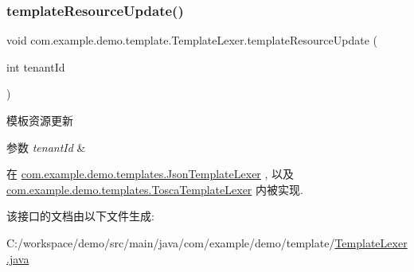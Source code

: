 \mbox{\label{interfacecom_1_1example_1_1demo_1_1template_1_1_template_lexer_a83b30db96a9095fe1fa5d9a9040c0ceb}} 
\subsubsection{\texorpdfstring{template\+Resource\+Update()}{templateResourceUpdate()}}
{\footnotesize\ttfamily void com.\+example.\+demo.\+template.\+Template\+Lexer.\+template\+Resource\+Update (\begin{DoxyParamCaption}\item[{int}]{tenant\+Id }\end{DoxyParamCaption})}

模板资源更新 
\begin{DoxyParams}{参数}
{\em tenant\+Id} & \\
\hline
\end{DoxyParams}


在 \mbox{\hyperlink{classcom_1_1example_1_1demo_1_1templates_1_1_json_template_lexer_a9be929460eadaa10ba1755ae9dbbffda}{com.\+example.\+demo.\+templates.\+Json\+Template\+Lexer}} , 以及 \mbox{\hyperlink{classcom_1_1example_1_1demo_1_1templates_1_1_tosca_template_lexer_aba212807a46b286b34d8f7984532186f}{com.\+example.\+demo.\+templates.\+Tosca\+Template\+Lexer}} 内被实现.



该接口的文档由以下文件生成\+:\begin{DoxyCompactItemize}
\item 
C\+:/workspace/demo/src/main/java/com/example/demo/template/\mbox{\hyperlink{_template_lexer_8java}{Template\+Lexer.\+java}}\end{DoxyCompactItemize}
